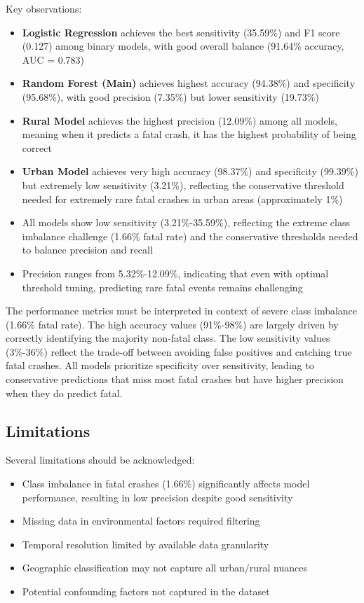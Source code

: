 \documentclass[12pt,a4paper]{article}
\begin{document}
Key observations:
\begin{itemize}
    \item \textbf{Logistic Regression} achieves the best sensitivity (35.59\%) and F1 score (0.127) among binary models, with good overall balance (91.64\% accuracy, AUC = 0.783)
    \item \textbf{Random Forest (Main)} achieves highest accuracy (94.38\%) and specificity (95.68\%), with good precision (7.35\%) but lower sensitivity (19.73\%)
    \item \textbf{Rural Model} achieves the highest precision (12.09\%) among all models, meaning when it predicts a fatal crash, it has the highest probability of being correct
    \item \textbf{Urban Model} achieves very high accuracy (98.37\%) and specificity (99.39\%) but extremely low sensitivity (3.21\%), reflecting the conservative threshold needed for extremely rare fatal crashes in urban areas (approximately 1\%)
    \item All models show low sensitivity (3.21\%-35.59\%), reflecting the extreme class imbalance challenge (1.66\% fatal rate) and the conservative thresholds needed to balance precision and recall
    \item Precision ranges from 5.32\%-12.09\%, indicating that even with optimal threshold tuning, predicting rare fatal events remains challenging
\end{itemize}

The performance metrics must be interpreted in context of severe class imbalance (1.66\% fatal rate). The high accuracy values (91\%-98\%) are largely driven by correctly identifying the majority non-fatal class. The low sensitivity values (3\%-36\%) reflect the trade-off between avoiding false positives and catching true fatal crashes. All models prioritize specificity over sensitivity, leading to conservative predictions that miss most fatal crashes but have higher precision when they do predict fatal.

\subsection{Limitations}
Several limitations should be acknowledged:
\begin{itemize}
    \item Class imbalance in fatal crashes (1.66\%) significantly affects model performance, resulting in low precision despite good sensitivity
    \item Missing data in environmental factors required filtering
    \item Temporal resolution limited by available data granularity
    \item Geographic classification may not capture all urban/rural nuances
    \item Potential confounding factors not captured in the dataset
\end{itemize}
\end{document}
